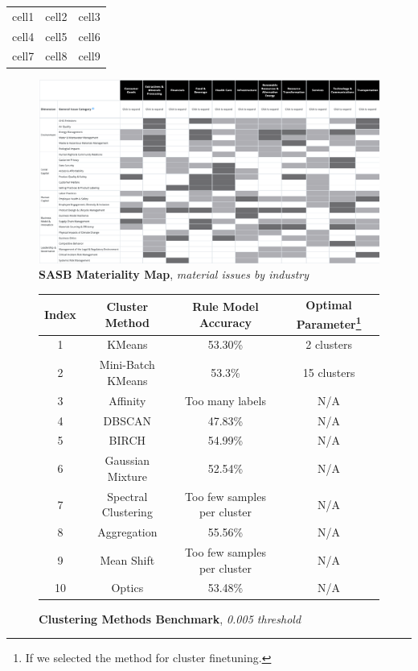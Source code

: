 \documentclass[12pt]{report}
\begin{document}
\begin{center}
\begin{tabular}{ c c c }
 cell1 & cell2 & cell3 \\ 
 cell4 & cell5 & cell6 \\  
 cell7 & cell8 & cell9 
\end{tabular}
\end{center}
\label{fig:sfdrindicators}

\begin{figure}[h!]

\centering
\includegraphics[scale=0.2]{materiality_map.png}
\caption{\textbf{SASB Materiality Map}, \textit{material issues by industry}}
\label{fig:materialitymap}
\end{figure}


\begin{figure}[h!]
\begin{center}
\begin{tabular}{ |c|c|c|c| }
\hline
 Index & Cluster Method & Rule Model Accuracy & Optimal Parameter\footnote{If we selected the method for cluster finetuning.} \\
 \hline\hline
 1 & KMeans & 53.30\% & 2 clusters \\  
 2 & Mini-Batch KMeans & 53.3\% & 15 clusters \\
 3 & Affinity & Too many labels & N/A \\
 4 & DBSCAN & 47.83\% & N/A \\
 5 & BIRCH & 54.99\% & N/A \\
 6 & Gaussian Mixture & 52.54\% & N/A \\
 7 & Spectral Clustering & Too few samples per cluster & N/A \\
 8 & Aggregation & 55.56\% & N/A \\
 9 & Mean Shift & Too few samples per cluster & N/A \\
 10 & Optics & 53.48\% & N/A \\
\hline
\end{tabular}
\end{center}
\caption{\textbf{Clustering Methods Benchmark}, \textit{0.005 threshold}}
\label{fig:clustering_benchmark}
\end{figure}
\end{document}
